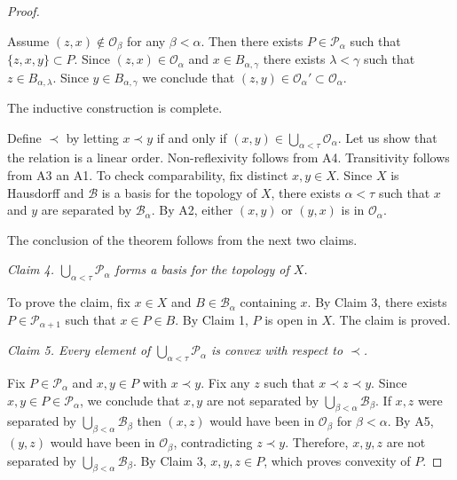 \documentclass[12pt]{amsart}
\begin{document}
\begin{proof}
\begin{description}
Assume  $(z,x)\not\in \mathcal O_\beta$ for any $\beta<\alpha$. Then there exists $P\in \mathcal P_\alpha$ such that $\{z,x,y\}\subset P$. Since $(z,x)\in \mathcal O_\alpha$ and $x\in B_{\alpha,\gamma}$ there exists $\lambda <\gamma$ such that $z\in B_{\alpha,\lambda}$. Since $y\in B_{\alpha,\gamma}$ we conclude that $(z,y)\in \mathcal O_\alpha'\subset \mathcal O_\alpha$.
\end{description}

\par\bigskip\noindent
The inductive construction is complete.

\par\bigskip\noindent
Define $\prec$  by letting $x\prec y$ if and only if $(x,y)\in \bigcup_{\alpha<\tau}\mathcal O_\alpha$.  Let us show that the relation is a linear order. Non-reflexivity follows from A4. Transitivity follows from A3 an A1. To check comparability, fix distinct $x,y\in X$. Since $X$ is Hausdorff and $\mathcal B$ is a basis for the topology of $X$, there exists $\alpha<\tau$ such that
$x$ and $y$ are separated by $\mathcal B_\alpha$. By A2, either $(x,y)$ or $(y,x)$ is in $\mathcal O_\alpha$. 

\par\bigskip\noindent
The conclusion of the theorem follows from the next two claims.

\par\bigskip\noindent
{\it Claim 4. $\bigcup_{\alpha<\tau} \mathcal P_\alpha$ forms a basis for the topology of $X$.}
\par\smallskip\noindent
To prove the claim, fix $x\in X$ and $B\in \mathcal B_\alpha$ containing $x$. By Claim 3, there exists $P\in \mathcal P_{\alpha+1}$ such that $x\in P\in B$. By Claim 1, $P$ is open in $X$. The claim is proved.

\par\bigskip\noindent
{\it Claim 5. Every element of $\bigcup_{\alpha<\tau}\mathcal P_\alpha$ is convex with respect to $\prec$.}
\par\smallskip\noindent
Fix $P\in\mathcal P_\alpha$ and $x,y\in P$ with $x\prec y$.  Fix any $z$ such that $x\prec z\prec y$. 
Since $x,y\in P\in\mathcal P_\alpha$, we conclude that $x,y$ are not separated by $\bigcup_{\beta<\alpha}\mathcal B_\beta$. If $x,z$ were separated by  $\bigcup_{\beta<\alpha}\mathcal B_\beta$ then $(x,z)$ would have been in $\mathcal O_\beta$ for $\beta<\alpha$. By A5, $(y,z)$ would have been in $\mathcal O_\beta$, contradicting $z\prec y$. Therefore, $x,y,z$ are not separated by 
 $\bigcup_{\beta<\alpha}\mathcal B_\beta$. By Claim 3, $x,y,z\in P$, which proves convexity of $P$.
\end{proof}
\end{document}
